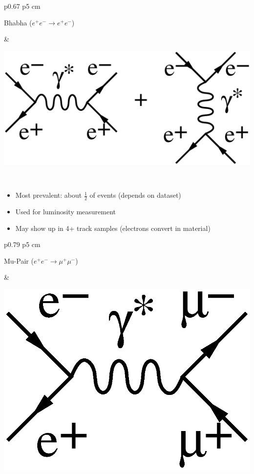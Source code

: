 \begin{slide*}
\slideframe{}
\begin{minipage}[t]{\linewidth}
\Large

\vspace{1 cm}

\begin{tabular}{p{0.67\linewidth} p{5 cm}}
\begin{minipage}{\linewidth}
  Bhabha ($e^+e^- \to e^+e^-$)
\end{minipage} & \begin{minipage}{\linewidth}
  \includegraphics[height=2 cm]{bhabha_diagrams.eps} 
\end{minipage} \\
\end{tabular}
\begin{itemize}

  \item Most prevalent: about $\frac{1}{2}$ of events (depends on dataset)


  \item Used for luminosity measurement

  \item May show up in 4+ track samples (electrons convert in material)

\end{itemize}

\vspace{1.5 cm}

\begin{tabular}{p{0.79\linewidth} p{5 cm}}
\begin{minipage}{\linewidth}
  Mu-Pair ($e^+e^- \to \mu^+\mu^-$)
\end{minipage} & \begin{minipage}{\linewidth}
  \includegraphics[height=1.4 cm]{mupair_diagrams.eps}
\end{minipage} \\
\end{tabular}


\end{minipage}
\end{slide*}
